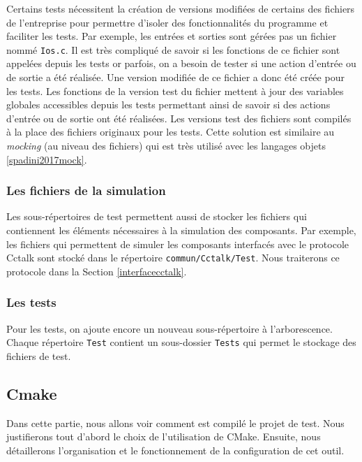 \documentclass[a4paper]{article}
\begin{document}
Certains tests nécessitent la création de versions modifiées de certains des
fichiers de l'entreprise pour permettre d'isoler des fonctionnalités du
programme et faciliter les tests. Par exemple, les entrées et sorties sont
gérées pas un fichier nommé \verb|Ios.c|. Il est très compliqué de savoir si les
fonctions de ce fichier sont appelées depuis les tests or parfois, on a besoin
de tester si une action d'entrée ou de sortie a été réalisée. Une version modifiée
de ce fichier a donc été créée pour les tests. Les fonctions de la version test
du fichier mettent à jour des variables globales accessibles depuis les tests
permettant ainsi de savoir si des actions d'entrée ou de sortie ont été
réalisées. Les versions test des fichiers sont compilés à la place des fichiers
originaux pour les tests. Cette solution est similaire au \textit{mocking} (au
niveau des fichiers) qui est très utilisé avec les langages objets
\ref{spadini2017mock}.

\subsubsection{Les fichiers de la simulation}

Les sous-répertoires de test permettent aussi de stocker les fichiers qui
contiennent les éléments nécessaires à la simulation des composants. Par exemple,
les fichiers qui permettent de simuler les composants interfacés avec le
protocole Cctalk sont stocké dans le répertoire \verb|commun/Cctalk/Test|. Nous
traiterons ce protocole dans la Section \ref{interfacecctalk}.

\subsubsection{Les tests}

Pour les tests, on ajoute encore un nouveau sous-répertoire à l'arborescence.
Chaque répertoire \verb|Test| contient un sous-dossier \verb|Tests| qui permet le
stockage des fichiers de test.

\subsection{Cmake}
\label{cmake}

Dans cette partie, nous allons voir comment est compilé le projet de test. Nous
justifierons tout d'abord le choix de l'utilisation de CMake. Ensuite, nous
détaillerons l'organisation et le fonctionnement de la configuration de cet
outil.
\end{document}
